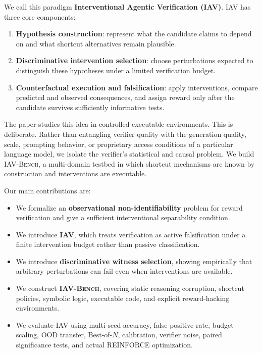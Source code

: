 \documentclass[10pt]{article}
\newcommand{\bench}{\textsc{IAV-Bench}}
\begin{document}
We call this paradigm \textbf{Interventional Agentic Verification (IAV)}. IAV has three core components:
\begin{enumerate}[leftmargin=1.3em]
    \item \textbf{Hypothesis construction}: represent what the candidate claims to depend on and what shortcut alternatives remain plausible.
    \item \textbf{Discriminative intervention selection}: choose perturbations expected to distinguish these hypotheses under a limited verification budget.
    \item \textbf{Counterfactual execution and falsification}: apply interventions, compare predicted and observed consequences, and assign reward only after the candidate survives sufficiently informative tests.
\end{enumerate}

The paper studies this idea in controlled executable environments. This is deliberate. Rather than entangling verifier quality with the generation quality, scale, prompting behavior, or proprietary access conditions of a particular language model, we isolate the verifier's statistical and causal problem. We build \bench{}, a multi-domain testbed in which shortcut mechanisms are known by construction and interventions are executable.

Our main contributions are:

\begin{itemize}[leftmargin=1.3em]
    \item We formalize an \textbf{observational non-identifiability} problem for reward verification and give a sufficient interventional separability condition.
    \item We introduce \textbf{IAV}, which treats verification as active falsification under a finite intervention budget rather than passive classification.
    \item We introduce \textbf{discriminative witness selection}, showing empirically that arbitrary perturbations can fail even when interventions are available.
    \item We construct \textbf{\bench{}}, covering static reasoning corruption, shortcut policies, symbolic logic, executable code, and explicit reward-hacking environments.
    \item We evaluate IAV using multi-seed accuracy, false-positive rate, budget scaling, OOD transfer, Best-of-$N$, calibration, verifier noise, paired significance tests, and actual REINFORCE optimization.
\end{itemize}
\end{document}
